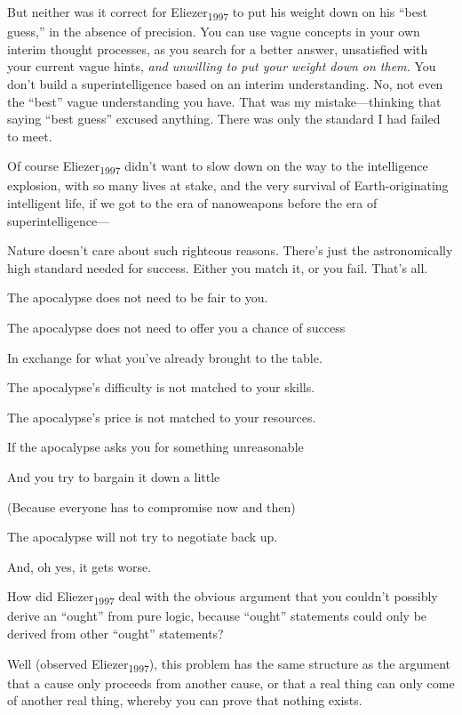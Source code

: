 {
 But neither was it correct for Eliezer\textsubscript{1997} to put
his weight down on his ``best
guess,'' in the absence of precision. You can use
vague concepts in your own interim thought processes, as you search for
a better answer, unsatisfied with your current vague hints, \textit{and
unwilling to put your weight down on them.} You don't
build a superintelligence based on an interim understanding. No, not
even the ``best'' vague
understanding you have. That was my mistake---thinking that saying
``best guess'' excused anything.
There was only the standard I had failed to meet.}

{
 Of course Eliezer\textsubscript{1997} didn't want
to slow down on the way to the intelligence explosion, with so many
lives at stake, and the very survival of Earth-originating intelligent
life, if we got to the era of nanoweapons before the era of
superintelligence---}

{
 Nature doesn't care about such righteous reasons.
There's just the astronomically high standard needed
for success. Either you match it, or you fail. That's
all.}

{
 The apocalypse does not need to be fair to you.}

{
 The apocalypse does not need to offer you a chance of success}

{
 In exchange for what you've already brought to the
table.}

{
 The apocalypse's difficulty is not matched to your
skills.}

{
 The apocalypse's price is not matched to your
resources.}

{
 If the apocalypse asks you for something unreasonable}

{
 And you try to bargain it down a little}

{
 (Because everyone has to compromise now and then)}

{
 The apocalypse will not try to negotiate back up.}

{
 And, oh yes, it gets worse.}

{
 How did Eliezer\textsubscript{1997} deal with the obvious argument
that you couldn't possibly derive an
``ought'' from pure logic, because
``ought'' statements could only be
derived from other ``ought''
statements?}

{
 Well (observed Eliezer\textsubscript{1997}), this problem has the
same structure as the argument that a cause only proceeds from another
cause, or that a real thing can only come of another real thing,
whereby you can prove that nothing exists.}

